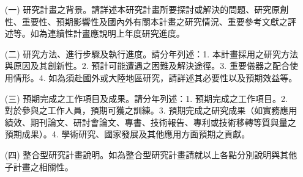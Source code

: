 \documentclass[12pt,a4paper]{article}
\begin{document}

\begin{enumerate}
\item[(一)] 研究計畫之背景。請詳述本研究計畫所要探討或解決的問題、研究原創性、重要性、預期影響性及國內外有關本計畫之研究情況、重要參考文獻之評述等。如為連續性計畫應說明上年度研究進度。
\item[(二)] 	研究方法、進行步驟及執行進度。請分年列述：1. 本計畫採用之研究方法與原因及其創新性。2. 預計可能遭遇之困難及解決途徑。3. 重要儀器之配合使用情形。4. 如為須赴國外或大陸地區研究，請詳述其必要性以及預期效益等。
\item[(三)] 預期完成之工作項目及成果。請分年列述：1. 預期完成之工作項目。2. 對於參與之工作人員，預期可獲之訓練。3. 預期完成之研究成果（如實務應用績效、期刊論文、研討會論文、專書、技術報告、專利或技術移轉等質與量之預期成果）。4. 學術研究、國家發展及其他應用方面預期之貢獻。
\item[(四)] 整合型研究計畫說明。如為整合型研究計畫請就以上各點分別說明與其他子計畫之相關性。
\end{enumerate}	



\label{LastPage}
\end{document}
